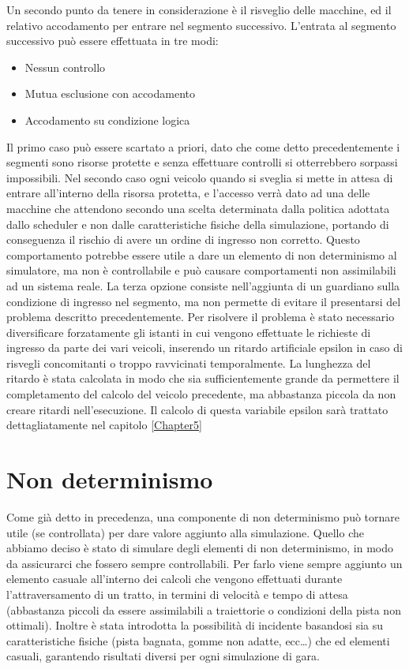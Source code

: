 Un secondo punto da tenere in considerazione è il risveglio delle macchine, ed il relativo accodamento per entrare nel segmento successivo.
L’entrata al segmento successivo può essere effettuata in tre modi:
\begin{itemize}
 \item Nessun controllo
 \item Mutua esclusione con accodamento
 \item Accodamento su condizione logica
\end{itemize}
Il primo caso può essere scartato a priori, dato che come detto precedentemente i segmenti sono risorse protette e senza effettuare controlli si otterrebbero sorpassi impossibili.
Nel secondo caso ogni veicolo quando si sveglia si mette in attesa di entrare all’interno della risorsa protetta, e l’accesso verrà dato ad una delle macchine che attendono secondo una scelta determinata dalla politica adottata dallo scheduler e non dalle caratteristiche fisiche della simulazione, portando di conseguenza il rischio di avere un ordine di ingresso non corretto. Questo comportamento potrebbe essere utile a dare un elemento di non determinismo al simulatore, ma non è controllabile e può causare comportamenti non assimilabili ad un sistema reale.
La terza opzione consiste nell'aggiunta di un guardiano sulla condizione di ingresso nel segmento, ma non permette di evitare il presentarsi del problema descritto precedentemente.
Per risolvere il problema è stato necessario diversificare forzatamente gli istanti in cui vengono effettuate le richieste di ingresso da parte dei vari veicoli, inserendo un ritardo artificiale epsilon in caso di risvegli concomitanti o troppo ravvicinati temporalmente. La lunghezza del ritardo è stata calcolata in modo che sia sufficientemente grande da permettere il completamento del calcolo del veicolo precedente, ma abbastanza piccola da non creare ritardi nell'esecuzione. Il calcolo di questa variabile epsilon sarà trattato dettagliatamente nel capitolo \ref{Chapter5}

\section{Non determinismo}

Come già detto in precedenza, una componente di non determinismo può tornare utile (se controllata) per dare valore aggiunto alla simulazione.
Quello che abbiamo deciso è stato di simulare degli elementi di non determinismo, in modo da assicurarci che fossero sempre controllabili.
Per farlo viene sempre aggiunto un elemento casuale all’interno dei calcoli che vengono effettuati durante l’attraversamento di un tratto, in termini di velocità e tempo di attesa (abbastanza piccoli da essere assimilabili a traiettorie o condizioni della pista non ottimali). Inoltre è stata introdotta la possibilità di incidente basandosi sia su caratteristiche fisiche (pista bagnata, gomme non adatte, ecc…) che ed elementi casuali, garantendo risultati diversi per ogni simulazione di gara.

